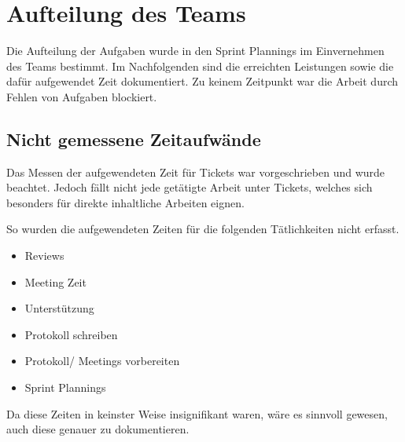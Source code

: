 \newcommand{\trWork}[6]
{
    \multicolumn{1}{|l|}{\textbf{\begin{tabular}[c]{@{}l@{}}#1\end{tabular}}} &
    \multicolumn{1}{l|}{\begin{tabular}[c]{@{}l@{}}#2\end{tabular}} &
    \multicolumn{1}{l|}{#3} &
    \\ \cline{1-3}
    \begin{tabular}[c]{@{}l@{}}#4\end{tabular} &
    \multicolumn{2}{l}{\begin{tabular}[c]{@{}l@{}}#5\end{tabular}} &
    \multirow{\begin{tabular}[c]{@{}l@{}}#6\end{tabular}} \\ \hline
}
\newcommand{\gitIssue}[1]
{
    \href{https://github.com/MaxTrautwein/AStA-Digital-Forms/issues/#1}{Issue #1}
}
\newcommand{\gitPull}[1]
{
    \href{https://github.com/MaxTrautwein/AStA-Digital-Forms/pull/#1}{PR #1}
}
\newcommand{\gitCommit}[2]
{
    \href{https://github.com/MaxTrautwein/AStA-Digital-Forms/pull/#1/commits/#2}{\StrLeft{#2}{10}}
}

\chapter{Aufteilung des Teams}\label{ch:aufteilung-des-teams}
Die Aufteilung der Aufgaben wurde in den Sprint Plannings im Einvernehmen des Teams bestimmt.
Im Nachfolgenden sind die erreichten Leistungen sowie die dafür aufgewendet Zeit dokumentiert.
Zu keinem Zeitpunkt war die Arbeit durch Fehlen von Aufgaben blockiert.

\section{Nicht gemessene Zeitaufwände}\label{sec:nicht-gemessene-zeitaufwande}
Das Messen der aufgewendeten Zeit für Tickets war vorgeschrieben und wurde beachtet.
Jedoch fällt nicht jede getätigte Arbeit unter Tickets, welches sich besonders für direkte inhaltliche Arbeiten eignen.

So wurden die aufgewendeten Zeiten für die folgenden Tätlichkeiten nicht erfasst.
\begin{itemize}
    \item Reviews
    \item Meeting Zeit
    \item Unterstützung
    \item Protokoll schreiben
    \item Protokoll/ Meetings vorbereiten
    \item Sprint Plannings
\end{itemize}
Da diese Zeiten in keinster Weise insignifikant waren, wäre es sinnvoll gewesen, auch diese genauer zu dokumentieren.

